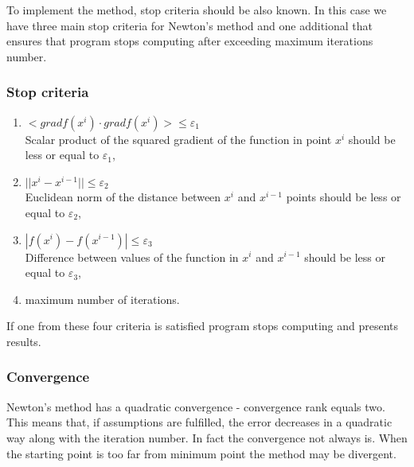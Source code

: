 \documentclass[12pt]{article}
\begin{document}
 To implement the method, stop criteria should be also known. In this case we have three main stop criteria for Newton's method and one additional that ensures that program stops computing after exceeding maximum iterations number.

\subsubsection{Stop criteria}
\begin{enumerate}%
\item $ <grad f(x^i) \cdot grad f(x^i)> \leqslant \varepsilon_1 $ \\
Scalar product of the squared gradient of the function in point $x^i$ should be less or equal to $\varepsilon_1 $,
\item $ ||x^i-x^{i-1}|| \leqslant \varepsilon_2 $ \\
Euclidean norm of the distance between $x^i$ and $x^{i-1}$ points should be less or equal to $\varepsilon_2 $,
\item $ |f(x^i)-f(x^{i-1})| \leqslant \varepsilon_3 $ \\
Difference between values of the function in $x^i$ and $x^{i-1}$ should be less or equal to $\varepsilon_3 $,
\item maximum number of iterations.
\end{enumerate}  
If one from these four criteria is satisfied program stops computing and presents results. 

\subsubsection{Convergence}
Newton's method has a quadratic convergence - convergence rank equals two. This means that, if assumptions are fulfilled, the error decreases in a quadratic way along with the iteration number. In fact the convergence not always is. When the starting point is too far from minimum point the method may be divergent.
\end{document}

